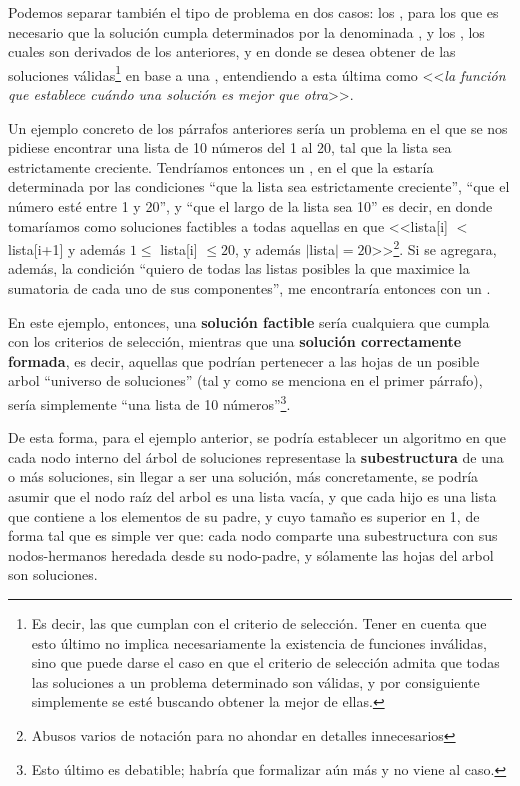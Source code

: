 \documentclass[11pt, a4paper, twoside]{article}
\begin{document}
Podemos separar también el tipo de problema en dos casos: los
, para los que es necesario que la
solución cumpla  determinados por la
denominada , y los
, los cuales son derivados de los
anteriores, y en donde se desea obtener  de las
soluciones válidas\footnote{ Es decir, las que cumplan con el criterio de
selección. Tener en cuenta que esto último no implica necesariamente la
existencia de funciones inválidas, sino que puede darse el caso en que el
criterio de selección admita que todas las soluciones a un problema determinado
son válidas, y por consiguiente simplemente se esté buscando obtener la mejor de
ellas.} en base a una , entendiendo a esta
última como <<\emph{la función que establece cuándo una solución es mejor que
otra}>>.


Un ejemplo concreto de los párrafos anteriores sería un problema en el que se
nos pidiese encontrar una lista de 10 números del 1 al 20, tal que la lista sea
estrictamente creciente. Tendríamos entonces un , en el que la  estaría determinada por
las condiciones ``que la lista sea estrictamente creciente'', ``que el número
esté entre 1 y 20'', y ``que el largo de la lista sea 10'' es decir, en donde
tomaríamos como soluciones factibles a todas aquellas en que <<lista[i] $<$
lista[i+1] y además $1 \leq $ lista[i] $ \leq 20$, y además $|$lista$|=
20$>>\footnote{Abusos varios de notación para no ahondar en detalles
innecesarios}. Si se agregara, además, la condición ``quiero de todas las listas
posibles la que maximice la sumatoria de cada uno de sus componentes'', me
encontraría entonces con un . 

En este ejemplo, entonces, una \textbf{solución factible} sería cualquiera que
cumpla con los criterios de selección, mientras que una \textbf{solución
correctamente formada}, es decir, aquellas que podrían pertenecer a las hojas de
un posible arbol ``universo de soluciones'' (tal y como se menciona en el primer
párrafo), sería simplemente ``una lista de 10 números''\footnote{Esto último es
debatible; habría que formalizar aún más y no viene al caso.}. 

De esta forma, para el ejemplo anterior, se podría establecer un algoritmo en
que cada nodo interno del árbol de soluciones representase la
\textbf{subestructura} de una o más soluciones, sin llegar a ser una solución,
más concretamente, se podría asumir que el nodo raíz del arbol es una lista
vacía, y que cada hijo es una lista que contiene a los elementos de su padre, y
cuyo tamaño es superior en 1, de forma tal que es simple ver que: cada nodo
comparte una subestructura con sus nodos-hermanos heredada desde su nodo-padre,
y sólamente las hojas del arbol son soluciones.
\end{document}
